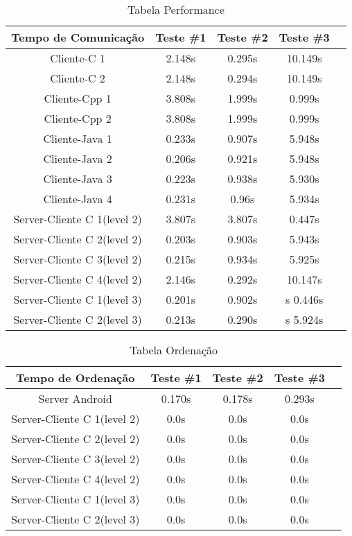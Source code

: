 \documentclass[12pt,a4paper]{article}
\begin{document}
\begin{table}[ht]
\caption{Tabela Performance}
\centering
\begin{tabular}{c c c c c}
\hline\hline
Tempo de Comunicação & Teste \#1 & Teste \#2 & Teste \#3 \\ [0.5ex]
\hline
Cliente-C 1 & 2.148s & 0.295s & 10.149s  \\		
Cliente-C 2 & 2.148s & 0.294s & 10.149s  \\		
Cliente-Cpp 1 & 3.808s & 1.999s & 0.999s  \\		
Cliente-Cpp 2 & 3.808s & 1.999s & 0.999s   \\		
Cliente-Java 1 & 0.233s & 0.907s & 5.948s \\	
Cliente-Java 2 & 0.206s & 0.921s & 5.948s \\ 	
Cliente-Java 3 & 0.223s & 0.938s & 5.930s \\ 	
Cliente-Java 4 & 0.231s & 0.96s & 5.934s \\ 	
Server-Cliente C 1(level 2) & 3.807s & 3.807s & 0.447s  \\		
Server-Cliente C 2(level 2) & 0.203s & 0.903s & 5.943s  \\		
Server-Cliente C 3(level 2) & 0.215s & 0.934s & 5.925s  \\		
Server-Cliente C 4(level 2) & 2.146s & 0.292s & 10.147s  \\	
Server-Cliente C 1(level 3) & 0.201s & 0.902s & s 0.446s \\ 	
Server-Cliente C 2(level 3) & 0.213s & 0.290s & s 5.924s \\ [1ex]
\hline
\end{tabular}
\end{table}

\begin{table}[ht]
\caption{Tabela Ordenação}
\centering
\begin{tabular}{c c c c c}
\hline\hline
Tempo de Ordenação & Teste \#1 & Teste \#2 & Teste \#3  \\ [0.5ex]
\hline
Server Android & 0.170s & 0.178s & 0.293s \\		
Server-Cliente C 1(level 2) & 0.0s & 0.0s & 0.0s \\		
Server-Cliente C 2(level 2) & 0.0s & 0.0s & 0.0s \\		
Server-Cliente C 3(level 2) & 0.0s & 0.0s & 0.0s \\		
Server-Cliente C 4(level 2)  & 0.0s & 0.0s & 0.0s \\	
Server-Cliente C 1(level 3)  & 0.0s & 0.0s & 0.0s \\ 	
Server-Cliente C 2(level 3)  & 0.0s & 0.0s & 0.0s \\ 	[1ex]
\hline
\end{tabular}
\end{table}
\newpage
\end{document}
